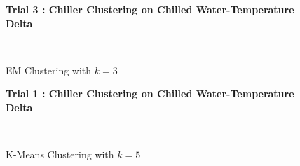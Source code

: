 \begin{figure}[!h]
\centerline{\bfseries\Large Trial 3 : Chiller Clustering on Chilled Water-Temperature Delta}\\
\caption{EM Clustering with $k=3$}
\end{figure}
\begin{figure}[!h]
\centerline{\bfseries\Large Trial 1 : Chiller Clustering on Chilled Water-Temperature Delta}\\
\caption{K-Means Clustering with $k=5$}
\end{figure}
